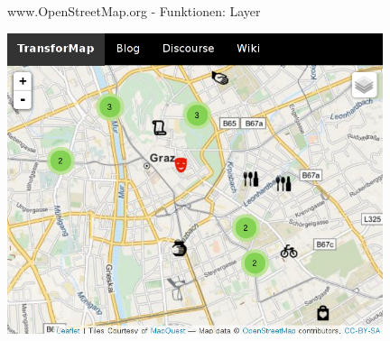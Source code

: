 \documentclass{beamer}
\begin{document}
\begin{frame}{ www.OpenStreetMap.org - Funktionen: Layer}

 \includegraphics[width=11cm]{transformap.png}

\end{frame}

%
%
%
%
\end{document}
